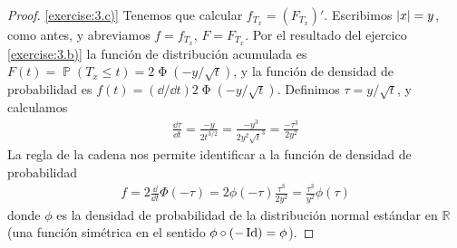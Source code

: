 \documentclass{article}
\DeclareMathOperator{\prob}{\mathbb{P}}
\DeclareMathOperator{\PhiDistribution}{\Phi}
\DeclareMathOperator{\identity}{\textnormal{Id}}
\newcommand{\realnum}{\mathbb{R}}
\theoremstyle{definition}
\begin{document}
\begin{proof}
\ref{exercise:3.c)}
Tenemos que calcular \(f_{T_x} = \left(F_{T_x}\right)'\).
Escribimos \(\abs{x} = y\), como antes, y abreviamos \(f = f_{T_x}\), \(F = F_{T_x}\).
Por el resultado del ejercico \ref{exercise:3.b)} la función de distribución acumulada es \(F{(t)} = \prob(T_x \leq t) = 2 \PhiDistribution \left(- y / \sqrt{t} \right)\), y la función de densidad de probabilidad es \(f{(t)} = (\dd / \dd t) 2 \PhiDistribution \left(- y / \sqrt{t} \right)\).
Definimos \(\tau = y / \sqrt{t}\), y calculamos 
\begin{align}
	\frac{\dd \tau}{\dd t} 
	= 
	\frac{- y}{2 t^{3 / 2}} 
	= 
	\frac{- y^3}{2 y^2 \sqrt{t}^3}
	=
	\frac{- \tau^3}{2 y^2}
\end{align}
La regla de la cadena nos permite identificar a la función de densidad de probabilidad
\begin{align}
	f 
	= 
	2 \frac{\dd}{\dd t} \Phi(- \tau)
	=
	2 \phi(- \tau) \frac{\tau^3}{2 y^2}
	=
	\frac{\tau^3}{y^2} \phi(\tau)
\end{align}
donde \(\phi\) es la densidad de probabilidad de la distribución normal estándar en \(\realnum\) (una función simétrica en el sentido \(\phi \circ (- \identity) = \phi\)).


\end{proof}
\end{document}
